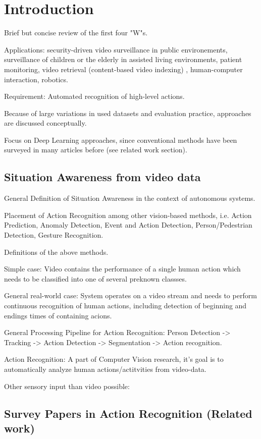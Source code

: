 \section{Introduction}
Brief but concise review of the first four "W"s.

Applications: security-driven video surveillance in public environements, surveillance of children or the elderly in assisted living environments, patient monitoring, video retrieval (content-based video indexing) , human-computer interaction, robotics.

Requirement: Automated recognition of high-level actions.

Because of large variations in used datasets and evaluation practice, approaches are discussed conceptually.

Focus on Deep Learning approaches, since conventional methods have been surveyed in many articles before (see related work section).


\subsection{Situation Awareness from video data}
General Definition of Situation Awareness in the context of autonomous systems.

Placement of Action Recognition among other vision-based methods, i.e. Action Prediction, Anomaly Detection, Event and Action Detection, Person/Pedestrian Detection, Gesture Recognition.

Definitions of the above methods.

Simple case: Video contains the performance of a single human action which needs to be classified into one of several preknown classses.

General real-world case: System operates on a video stream and needs to perform continuous recognition of human actions, including detection of beginning and endings times of containing acions.

General Processing Pipeline for Action Recognition: Person Detection -> Tracking -> Action Detection -> Segmentation -> Action recognition.

Action Recognition: A part of Computer Vision research, it's goal is to automatically analyze human actions/actitvities from video-data. 

Other sensory input than video possible: 


\subsection{Survey Papers in Action Recognition (Related work)}


